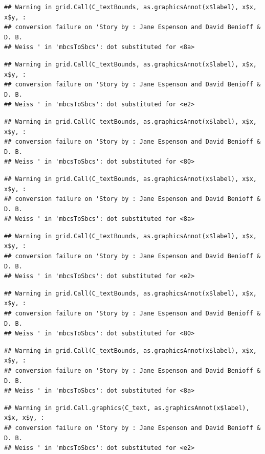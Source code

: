 \documentclass[]{article}
\begin{document}
\begin{verbatim}
## Warning in grid.Call(C_textBounds, as.graphicsAnnot(x$label), x$x, x$y, :
## conversion failure on 'Story by : Jane Espenson and David Benioff & D. B.
## Weiss ' in 'mbcsToSbcs': dot substituted for <8a>
\end{verbatim}

\begin{verbatim}
## Warning in grid.Call(C_textBounds, as.graphicsAnnot(x$label), x$x, x$y, :
## conversion failure on 'Story by : Jane Espenson and David Benioff & D. B.
## Weiss ' in 'mbcsToSbcs': dot substituted for <e2>
\end{verbatim}

\begin{verbatim}
## Warning in grid.Call(C_textBounds, as.graphicsAnnot(x$label), x$x, x$y, :
## conversion failure on 'Story by : Jane Espenson and David Benioff & D. B.
## Weiss ' in 'mbcsToSbcs': dot substituted for <80>
\end{verbatim}

\begin{verbatim}
## Warning in grid.Call(C_textBounds, as.graphicsAnnot(x$label), x$x, x$y, :
## conversion failure on 'Story by : Jane Espenson and David Benioff & D. B.
## Weiss ' in 'mbcsToSbcs': dot substituted for <8a>
\end{verbatim}

\begin{verbatim}
## Warning in grid.Call(C_textBounds, as.graphicsAnnot(x$label), x$x, x$y, :
## conversion failure on 'Story by : Jane Espenson and David Benioff & D. B.
## Weiss ' in 'mbcsToSbcs': dot substituted for <e2>
\end{verbatim}

\begin{verbatim}
## Warning in grid.Call(C_textBounds, as.graphicsAnnot(x$label), x$x, x$y, :
## conversion failure on 'Story by : Jane Espenson and David Benioff & D. B.
## Weiss ' in 'mbcsToSbcs': dot substituted for <80>
\end{verbatim}

\begin{verbatim}
## Warning in grid.Call(C_textBounds, as.graphicsAnnot(x$label), x$x, x$y, :
## conversion failure on 'Story by : Jane Espenson and David Benioff & D. B.
## Weiss ' in 'mbcsToSbcs': dot substituted for <8a>
\end{verbatim}

\begin{verbatim}
## Warning in grid.Call.graphics(C_text, as.graphicsAnnot(x$label), x$x, x$y, :
## conversion failure on 'Story by : Jane Espenson and David Benioff & D. B.
## Weiss ' in 'mbcsToSbcs': dot substituted for <e2>
\end{verbatim}
\end{document}
